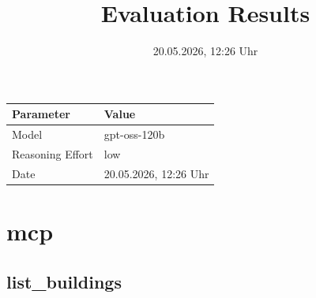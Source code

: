 \documentclass[a4paper,11pt]{article}
\title{Evaluation Results}
\date{20.05.2026, 12:26 Uhr}
\begin{document}
\maketitle

\begin{table}[H]
\centering
\begin{tabular}{l l}
\toprule
\textbf{Parameter} & \textbf{Value} \\
\midrule
Model & gpt-oss-120b \\
Reasoning Effort & low \\
Date & 20.05.2026, 12:26 Uhr \\
\bottomrule
\end{tabular}
\end{table}

\tableofcontents
\clearpage

\section{mcp}

\subsection{list\_buildings}
\end{document}
